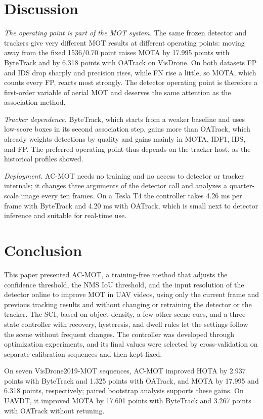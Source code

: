\documentclass[journal]{new-aiaa}
\begin{document}
\section{Discussion}\label{sec:discussion}

\emph{The operating point is part of the MOT system.} The same frozen detector
and trackers give very different MOT results at different operating points:
moving away from the fixed 1536/0.70 point raises MOTA by 17.995 points with
ByteTrack and by 6.318 points with OATrack on VisDrone. On both datasets FP
and IDS drop sharply and precision rises, while FN rise a little, so MOTA,
which counts every FP, reacts most strongly. The detector operating point is therefore a first-order variable of
aerial MOT and deserves the same attention as the association method.

\emph{Tracker dependence.} ByteTrack, which starts from a weaker baseline and
uses low-score boxes in its second association step, gains more than OATrack,
which already weights detections by quality and gains mainly in MOTA, IDF1,
IDS, and FP. The preferred operating point thus depends on the tracker
host, as the historical profiles showed.

\emph{Deployment.} AC-MOT needs no training and no access to detector or
tracker internals; it changes three arguments of the detector call and
analyzes a quarter-scale image every ten frames. On a Tesla T4 the controller
takes 4.26 ms per frame with ByteTrack and 4.20 ms with OATrack, which is
small next to detector inference and suitable for real-time use.
\section{Conclusion}\label{sec:conclusion}

This paper presented AC-MOT, a training-free method that adjusts the
confidence threshold, the NMS IoU threshold, and the input resolution of the
detector online to improve MOT in UAV videos, using only the current frame and
previous tracking results and without changing or retraining the detector or
the tracker. The SCI, based on object density, a few other scene
cues, and a three-state controller with recovery, hysteresis, and dwell rules
let the settings follow the scene without frequent changes.
The controller was developed through optimization experiments, and its final
values were selected by cross-validation on separate calibration sequences and
then kept fixed.

On seven VisDrone2019-MOT sequences, AC-MOT improved HOTA by 2.937 points with
ByteTrack and 1.325 points with OATrack, and MOTA by 17.995 and 6.318 points,
respectively; paired bootstrap analysis supports these gains. On UAVDT, it improved MOTA by 17.601 points with
ByteTrack and 3.267 points with OATrack without retuning.
\end{document}
